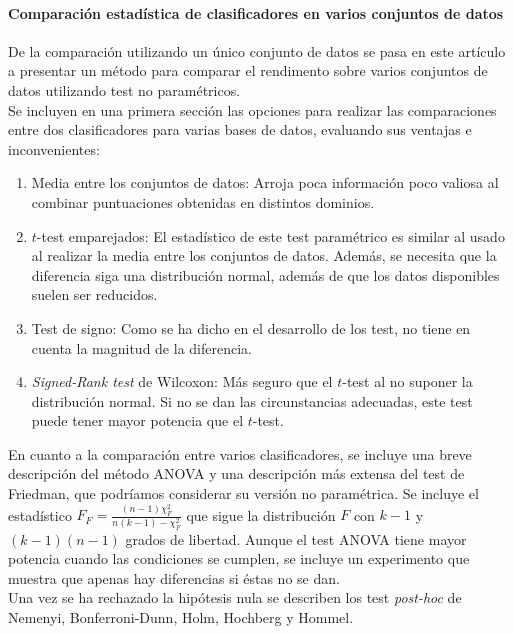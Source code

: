\paragraph{Comparación estadística de clasificadores en varios conjuntos de datos} \cite{DEMSAR06} De la comparación utilizando un único conjunto de datos se pasa en este artículo a presentar un método para comparar el rendimento sobre varios conjuntos de datos utilizando test no paramétricos.\\
	Se incluyen en una primera sección las opciones para realizar las comparaciones entre dos clasificadores para varias bases de datos, evaluando sus ventajas e inconvenientes:
	\begin{enumerate}
	\item Media entre los conjuntos de datos: Arroja poca información poco valiosa al combinar puntuaciones obtenidas en distintos dominios.
	\item $t$-test emparejados: El estadístico de este test paramétrico es similar al usado al realizar la media entre los conjuntos de datos. Además, se necesita que la diferencia siga una distribución normal, además de que los datos disponibles suelen ser reducidos. 
	\item Test de signo: Como se ha dicho en el desarrollo de los test, no tiene en cuenta la magnitud de la diferencia.
	\item \textit{Signed-Rank test} de Wilcoxon: Más seguro que el $t$-test al no suponer la distribución normal. Si no se dan las circunstancias adecuadas, este test puede tener mayor potencia que el $t$-test.
	\end{enumerate}
	
	En cuanto a la comparación entre varios clasificadores, se incluye una breve descripción del método ANOVA y una descripción más extensa del test de Friedman, que podríamos considerar su versión no paramétrica. Se incluye el estadístico $F_F = \frac{(n-1) \chi^2_F}{n(k-1) - \chi^2_F}$ que sigue la distribución $F$ con $k-1$ y $(k-1)(n-1)$ grados de libertad. Aunque el test ANOVA tiene mayor potencia cuando las condiciones se cumplen, se incluye un experimento que muestra que apenas hay diferencias si éstas no se dan.\\
	Una vez se ha rechazado la hipótesis nula se describen los test \textit{post-hoc} de Nemenyi, Bonferroni-Dunn, Holm, Hochberg y Hommel.
	
	
